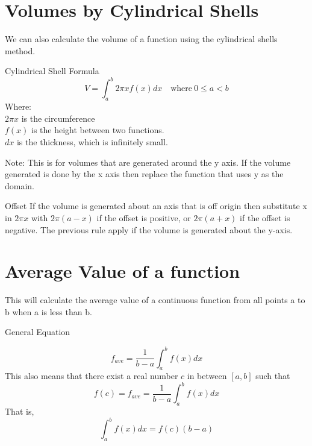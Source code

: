 \documentclass[letterpaper,10pt,twoside,twocolumn,openany]{book}
\begin{document}
\section{Volumes by Cylindrical Shells}
We can also calculate the volume of a function using the cylindrical shells method.
\begin{DndSidebar}[]{Cylindrical Shell Formula}
    \begin{equation}
        V = \int_a^b 2\pi x f(x) dx \quad \text{where}\ 0 \leq a < b
    \end{equation}
    Where: \\
    $2\pi x$ is the circumference\\
    $f(x)$ is the height between two functions.\\
    $dx$ is the thickness, which is infinitely small.
\end{DndSidebar}
\begin{DndComment}{}
    Note: This is for volumes that are generated around the y axis. If the volume generated is done by the x axis then replace the function that uses y as the domain.    
\end{DndComment}


\begin{DndComment}{Offset}
    If the volume is generated about an axis that is off origin then substitute x in $2\pi x$ with $2\pi (a - x)$ if the offset is positive, or $2\pi (a + x)$ if the offset is negative. The previous rule apply if the volume is generated about the y-axis. 
\end{DndComment}



\section{Average Value of a function}
This will calculate the average value of a continuous function from all points a to b when a is less than b.
\begin{DndSidebar}[]{General Equation}
    
    \begin{equation}
        f_{ave} = \frac{1}{b-a} \int_a^b f(x)dx 
    \end{equation}
    This also means that there exist a real number $c$ in between $[a,b]$ such that
    \begin{equation}
        f(c) = f_{ave} = \frac{1}{b-a} \int_a^b f(x)dx 
    \end{equation}
    That is, 
    \begin{equation}
        \int_a^b f(x)dx = f(c)(b-a)
    \end{equation}
\end{DndSidebar}
\newpage
\end{document}
